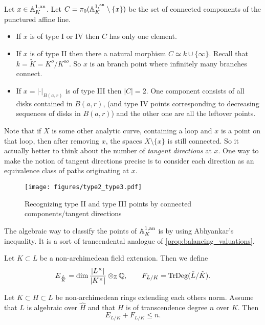 \begin{proposition}
	Let $x \in \mathbb{A}_K^{1,\text{an}}$. 
	Let $C = \pi_0(\mathbb{A}_K^{1, {}^{\text{an}}}\setminus \{ x\} )$ be the set of connected components of the punctured affine line. 
	\begin{itemize}
		\item If $x$ is of type I  or IV then $C$ has only one element.
		\item If $x$ is of type II then there a natural morphism $C \simeq k \cup \{\infty\} $. Recall that $k = \tilde K = K^{o} / K^{oo} $. 
			So $x$ is an branch point where infinitely many branches connect. 
		\item If $x = |\cdot |_{B(a, r)}$ is of type III then $|C| = 2$. One component consists of all disks contained in $B(a, r)$, (and type IV points corresponding to decreasing sequences of disks in $B(a,r)$) and the other one are all the leftover points. 
	\end{itemize}
\end{proposition}
\begin{remark}
	Note that if  $X$ is some other analytic curve, containing a loop and $x$ is a point on that loop, then after removing $x$, the spaces $X \setminus \{x\} $ is still connected. 
	So it actually better to think about the number of \emph{tangent directions} at $x$. 
	One way to make the notion of tangent directions precise is to consider each direction as an equivalence class of paths originating at $x$.
\end{remark}
\begin{figure}[h]
	\centering
	\texttt{[image: figures/type2\_type3.pdf]}
	\caption{Recognizing type II and type III points by connected components/tangent directions}
	\label{fig:type2_type3}
\end{figure}


The algebraic way to classify the points of $\mathbb{A}_K^{1,\text{an}}$ is by using Abhyankar's inequality. 
It is a sort of trancendental analogue of \cref{prop:balancing_valuations}.
\begin{definition}
	Let $K \subset L$ be a non-archimedean field extension. 
	Then we define \[
		E_{\frac{L}{ K}} = \dim \frac{|L^{\times }|}{|K^{\times }|} \otimes_{\mathbb{Z}} \mathbb{Q}, \qquad F_{L / K} = \operatorname{TrDeg}(\tilde L / \tilde K)
	.\] 
\end{definition}

\begin{theorem}
	Let $K \subset H \subset L$ be non-archimedean rings extending each others norm. Assume that $L$ is algebraic over $\hat{H}$ and that $H$ is of transcendence degree $n$ over $K$. Then \[
	E_{L / K} + F_{L / K}  \le n
	.\] 
\end{theorem}

